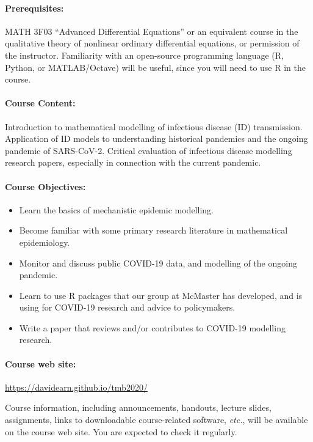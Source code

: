\documentclass[12pt]{article}
\begin{document}
\paragraph*{Prerequisites:} MATH 3F03 ``Advanced Differential
Equations'' or an equivalent course in the qualitative theory of
nonlinear ordinary differential equations, or permission of the
instructor.  Familiarity with an open-source programming language (R,
Python, or MATLAB/Octave) will be useful, since you will need to use
R in the course.

\paragraph*{Course Content:}

Introduction to mathematical modelling of infectious disease (ID)
transmission.  Application of ID models to understanding historical
pandemics and the ongoing pandemic of SARS-CoV-2.  Critical evaluation
of infectious disease modelling research papers, especially in
connection with the current pandemic.

\paragraph*{Course Objectives:}

\begin{itemize}
\item Learn the basics of mechanistic epidemic modelling.
\item Become familiar with some primary research literature in
  mathematical epidemiology. 
\item Monitor and discuss public COVID-19 data, and modelling of the ongoing pandemic.
\item Learn to use R packages that our group at McMaster has developed,
  and is using for COVID-19 research and advice to policymakers.
\item Write a paper that reviews and/or contributes to COVID-19
  modelling research.
\end{itemize}

\paragraph*{Course web site:} \url{https://davidearn.github.io/tmb2020/}

\noindent
Course information, including announcements, handouts, lecture slides, assignments, links to downloadable course-related software, {\it etc.\/}, will be available on the course web site.  You are expected to check it regularly.
\end{document}
